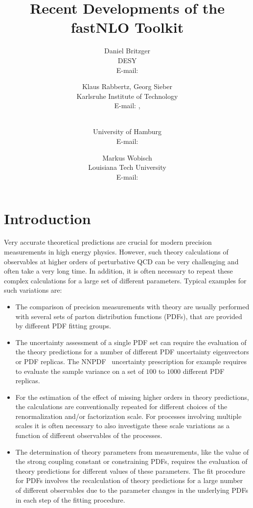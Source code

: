 \documentclass{PoS}
\title{Recent Developments of the fastNLO Toolkit}
\author{Daniel Britzger\\
        DESY\\
        E-mail: \email{daniel.britzger@desy.de}}
\author{Klaus Rabbertz, Georg Sieber\\
        Karlsruhe Institute of Technology\\
        E-mail: \email{klaus.rabbertz@cern.ch}, \email{georg.sieber@cern.ch}}
\author{\speaker{Fred Stober}\\
        University of Hamburg\\
        E-mail: \email{stober@cern.ch}}
\author{Markus Wobisch\\
        Louisiana Tech University\\
        E-mail: \email{wobisch@fnal.gov}}
\begin{document}
\section{Introduction}

Very accurate theoretical predictions are crucial for modern
precision measurements in high energy physics.
However, such theory calculations of observables at higher orders
of perturbative QCD can be very challenging and often take a very long
time. In addition, it is often necessary to repeat these complex
calculations for a large set of different parameters. Typical examples for such variations are:

\begin{itemize}
\item The comparison of precision measurements with theory are usually
  performed with several sets of parton distribution functions (PDFs),
  that are provided by different PDF fitting groups. %
\item The uncertainty assessment of a single PDF set can require
  the evaluation of the theory predictions for a number of different
  PDF uncertainty eigenvectors or PDF replicas. The NNPDF~\cite{Ball:2014uwa} uncertainty
  prescription for example requires to evaluate the sample variance on a set of
  $100$ to $1000$ different PDF replicas.
\item For the estimation of the effect of missing higher orders in theory
  predictions, the calculations are conventionally repeated for different
  choices of the renormalization and/or factorization scale. For processes
  involving multiple scales it is often necessary to also
  investigate these scale variations as a function of different observables of
  the processes.
\item The determination of theory parameters from measurements, like
  the value of the strong coupling constant or constraining PDFs,
  requires the evaluation of theory predictions for different values
  of these parameters.
  The fit procedure for PDFs involves the recalculation
  of theory predictions for a large number of different observables due to
  the parameter changes in the underlying PDFs in each step of the fitting procedure.
\end{itemize}
\end{document}
